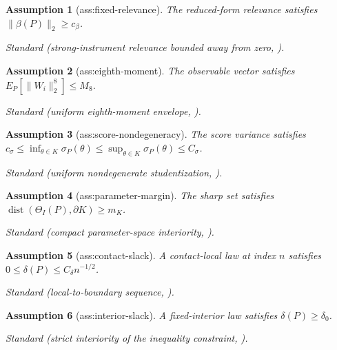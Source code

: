 \documentclass{article}
\newtheorem{assumption}{Assumption}
\begin{document}
\begin{assumption}[ass:fixed-relevance]\label{ass:fixed-relevance}
The reduced-form relevance satisfies \(\|\beta(P)\|_2\geq c_{\beta}\).
\par\smallskip\noindent\emph{Standard} (strong-instrument relevance bounded away from zero, \cite{staigerStock1997weak}).
\end{assumption}

\begin{assumption}[ass:eighth-moment]\label{ass:eighth-moment}
The observable vector satisfies \(E_P[\|W_i\|_2^8]\leq M_8\).
\par\smallskip\noindent\emph{Standard} (uniform eighth-moment envelope, \cite{romanoShaikh2010identifiedSet}).
\end{assumption}

\begin{assumption}[ass:score-nondegeneracy]\label{ass:score-nondegeneracy}
The score variance satisfies \(c_{\sigma}\leq\inf_{\theta\in K}\sigma_P(\theta)\leq\sup_{\theta\in K}\sigma_P(\theta)\leq C_{\sigma}\).
\par\smallskip\noindent\emph{Standard} (uniform nondegenerate studentization, \cite{chernozhukovChetverikovKato2013gaussian}).
\end{assumption}

\begin{assumption}[ass:parameter-margin]\label{ass:parameter-margin}
The sharp set satisfies \(\operatorname{dist}(\Theta_I(P),\partial K)\geq m_K\).
\par\smallskip\noindent\emph{Standard} (compact parameter-space interiority, \cite{romanoShaikh2010identifiedSet}).
\end{assumption}

\begin{assumption}[ass:contact-slack]\label{ass:contact-slack}
A contact-local law at index \(n\) satisfies \(0\leq\delta(P)\leq C_{\delta}n^{-1/2}\).
\par\smallskip\noindent\emph{Standard} (local-to-boundary sequence, \cite{andrews2000boundary}).
\end{assumption}

\begin{assumption}[ass:interior-slack]\label{ass:interior-slack}
A fixed-interior law satisfies \(\delta(P)\geq\delta_0\).
\par\smallskip\noindent\emph{Standard} (strict interiority of the inequality constraint, \cite{chernozhukovNeweySantos2023constrained}).
\end{assumption}
\end{document}
